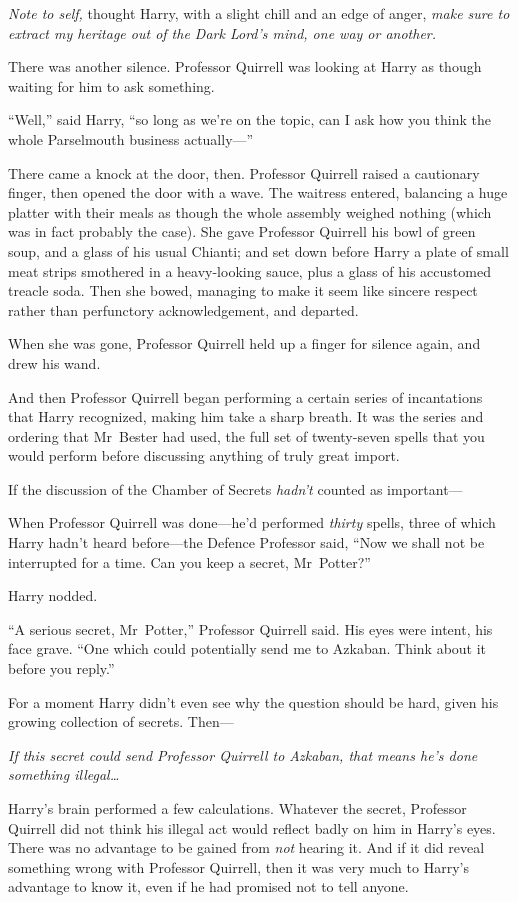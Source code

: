 \emph{Note to self,} thought Harry, with a slight chill and an edge of anger, \emph{make sure to extract my heritage out of the Dark Lord’s mind, one way or another.}

There was another silence. Professor Quirrell was looking at Harry as though waiting for him to ask something.

“Well,” said Harry, “so long as we’re on the topic, can I ask how you think the whole Parselmouth business actually—”

There came a knock at the door, then. Professor Quirrell raised a cautionary finger, then opened the door with a wave. The waitress entered, balancing a huge platter with their meals as though the whole assembly weighed nothing (which was in fact probably the case). She gave Professor Quirrell his bowl of green soup, and a glass of his usual Chianti; and set down before Harry a plate of small meat strips smothered in a heavy-looking sauce, plus a glass of his accustomed treacle soda. Then she bowed, managing to make it seem like sincere respect rather than perfunctory acknowledgement, and departed.

When she was gone, Professor Quirrell held up a finger for silence again, and drew his wand.

And then Professor Quirrell began performing a certain series of incantations that Harry recognized, making him take a sharp breath. It was the series and ordering that Mr~Bester had used, the full set of twenty-seven spells that you would perform before discussing anything of truly great import.

If the discussion of the Chamber of Secrets \emph{hadn’t} counted as important—

When Professor Quirrell was done—he’d performed \emph{thirty} spells, three of which Harry hadn’t heard before—the Defence Professor said, “Now we shall not be interrupted for a time. Can you keep a secret, Mr~Potter?”

Harry nodded.

“A serious secret, Mr~Potter,” Professor Quirrell said. His eyes were intent, his face grave. “One which could potentially send me to Azkaban. Think about it before you reply.”

For a moment Harry didn’t even see why the question should be hard, given his growing collection of secrets. Then—

\emph{If this secret could send Professor Quirrell to Azkaban, that means he’s done something illegal…}

Harry’s brain performed a few calculations. Whatever the secret, Professor Quirrell did not think his illegal act would reflect badly on him in Harry’s eyes. There was no advantage to be gained from \emph{not} hearing it. And if it did reveal something wrong with Professor Quirrell, then it was very much to Harry’s advantage to know it, even if he had promised not to tell anyone.

